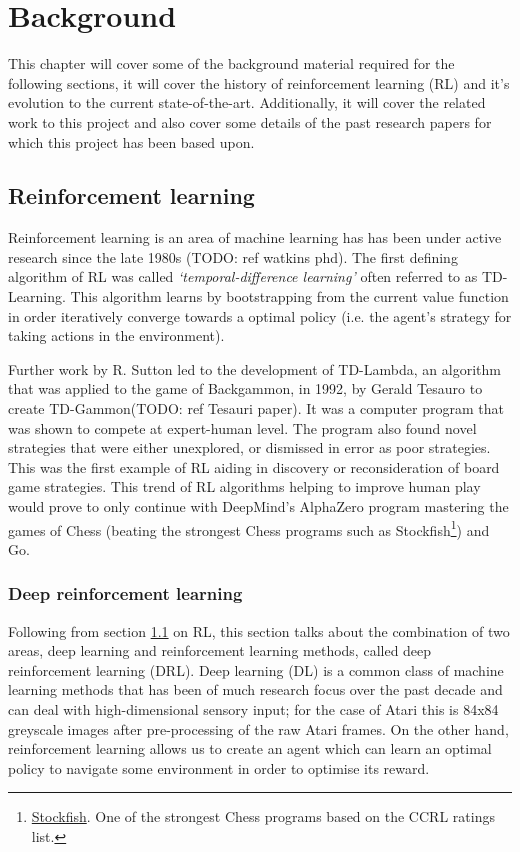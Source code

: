 \chapter{Background}
\label{cha:bg}

This chapter will cover some of the background material required for the following sections, it will cover the history of reinforcement learning (RL) and it's evolution to the current state-of-the-art. Additionally, it will cover the related work to this project and also cover some details of the past research papers for which this project has been based upon.

\section{Reinforcement learning}
\label{bg:sec:rl}
Reinforcement learning is an area of machine learning has has been under active research since the late 1980s (TODO: ref watkins phd). The first defining algorithm of RL was called \textit{`temporal-difference learning'} often referred to as TD-Learning. This algorithm learns by bootstrapping from the current value function in order iteratively converge towards a optimal policy (i.e. the agent's strategy for taking actions in the environment).

Further work by R. Sutton led to the development of TD-Lambda, an algorithm that was applied to the game of Backgammon, in 1992, by Gerald Tesauro to create TD-Gammon(TODO: ref Tesauri paper). It was a computer program that was shown to compete at expert-human level. The program also found novel strategies that were either unexplored, or dismissed in error as poor strategies. This was the first example of RL aiding in discovery or reconsideration of board game strategies. This trend of RL algorithms helping to improve human play would prove to only continue with DeepMind's AlphaZero program mastering the games of Chess (beating the strongest Chess programs such as Stockfish\footnote{\href{https://stockfishchess.org}{Stockfish}. One of the strongest Chess programs based on the CCRL ratings list.}) and Go.

\subsection{Deep reinforcement learning}
\label{bg:sec:deeprl}
Following from section \ref{bg:sec:rl} on RL, this section talks about the combination of two areas, deep learning and reinforcement learning methods, called deep reinforcement learning (DRL). Deep learning (DL) is a common class of machine learning methods that has been of much research focus over the past decade and can deal with high-dimensional sensory input; for the case of Atari this is 84x84 greyscale images after pre-processing of the raw Atari frames. On the other hand, reinforcement learning allows us to create an agent which can learn an optimal policy to navigate some environment in order to optimise its reward.

